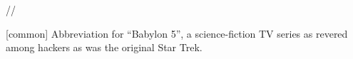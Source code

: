  //

[common] Abbreviation for ``Babylon 5'', a science-fiction TV series as revered
among hackers as was the original Star Trek.

